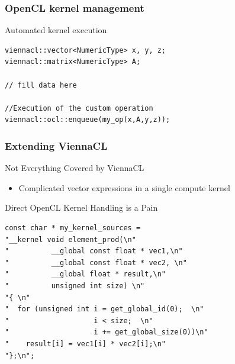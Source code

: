 \begin{frame}[fragile]
\frametitle{OpenCL kernel management}

\begin{block}{Automated kernel execution}
  \begin{lstlisting}
viennacl::vector<NumericType> x, y, z;
viennacl::matrix<NumericType> A;
  
// fill data here
  
//Execution of the custom operation
viennacl::ocl::enqueue(my_op(x,A,y,z));
  \end{lstlisting}
\end{block}

\end{frame}





\begin{frame}[fragile]
\frametitle{Extending ViennaCL}

\begin{block}{Not Everything Covered by ViennaCL}
 \begin{itemize}
  \item Complicated vector expressions in a single compute kernel
 \end{itemize}
\end{block}

\begin{block}{Direct OpenCL Kernel Handling is a Pain}
  \begin{lstlisting}
const char * my_kernel_sources = 
"__kernel void element_prod(\n"
"          __global const float * vec1,\n"
"          __global const float * vec2, \n"
"          __global float * result,\n"
"          unsigned int size) \n"
"{ \n"
"  for (unsigned int i = get_global_id(0);  \n"
"                    i < size;  \n"
"                    i += get_global_size(0))\n"
"    result[i] = vec1[i] * vec2[i];\n"
"};\n";
  \end{lstlisting}
\end{block}

\end{frame}


